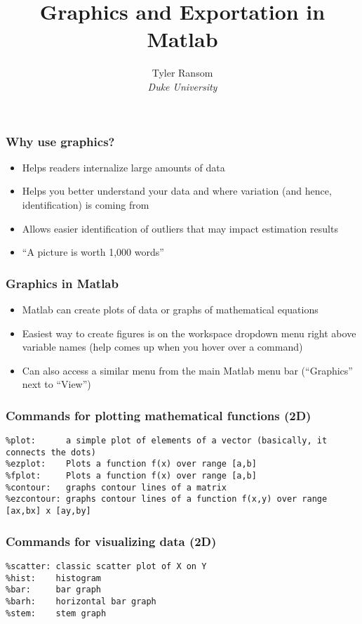 \documentclass[english,xcolor=dvipsnames]{beamer}
\newcommand{\bi}{\begin{itemize}}
\newcommand{\ei}{\end{itemize}}
\begin{document}
\begin{frame}
\title{Graphics and Exportation in Matlab}
\author{
	Tyler Ransom\\
	\emph{Duke University}\\
}
\titlepage
\end{frame}

\begin{frame}
\frametitle{Why use graphics?}
   \bi 
   \item Helps readers internalize large amounts of data
   \item Helps you better understand your data and where variation (and hence, identification) is coming from
   \item Allows easier identification of outliers that may impact estimation results
   \item ``A picture is worth 1,000 words''
   \ei
\end{frame}

\begin{frame}
\frametitle{Graphics in Matlab}
   \bi 
   \item Matlab can create plots of data or graphs of mathematical equations
   \item Easiest way to create figures is on the workspace dropdown menu right above variable names (help comes up when you hover over a command)
   \item Can also access a similar menu from the main Matlab menu bar (``Graphics'' next to ``View'')
   \ei
\end{frame}

\begin{frame}[fragile]
\frametitle{Commands for plotting mathematical functions (2D)}
\begin{lstlisting}
%plot:      a simple plot of elements of a vector (basically, it connects the dots)
%ezplot:    Plots a function f(x) over range [a,b]
%fplot:     Plots a function f(x) over range [a,b]
%contour:   graphs contour lines of a matrix
%ezcontour: graphs contour lines of a function f(x,y) over range [ax,bx] x [ay,by]
\end{lstlisting}
\end{frame}

\begin{frame}[fragile]
\frametitle{Commands for visualizing data (2D)}
\begin{lstlisting}
%scatter: classic scatter plot of X on Y
%hist:    histogram
%bar:     bar graph
%barh:    horizontal bar graph
%stem:    stem graph
\end{lstlisting}
\end{frame}
\end{document}
